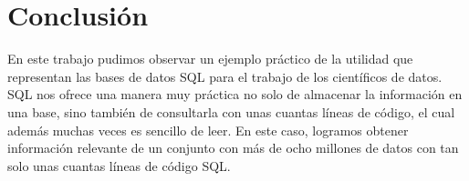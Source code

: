 \documentclass[11pt]{article}
\begin{document}
\hypertarget{conclusiuxf3n}{%
\section{Conclusión}\label{conclusiuxf3n}}

En este trabajo pudimos observar un ejemplo práctico de la utilidad que
representan las bases de datos SQL para el trabajo de los científicos de
datos. SQL nos ofrece una manera muy práctica no solo de almacenar la
información en una base, sino también de consultarla con unas cuantas
líneas de código, el cual además muchas veces es sencillo de leer. En
este caso, logramos obtener información relevante de un conjunto con más
de ocho millones de datos con tan solo unas cuantas líneas de código
SQL.


    
    
    
\end{document}
